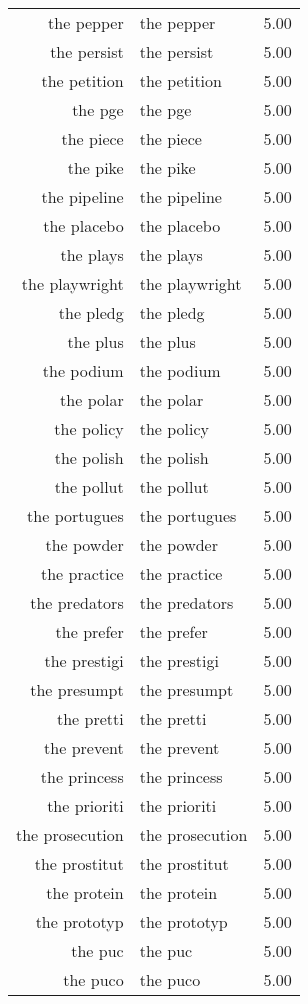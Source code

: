 \begin{table}[ht]
\begin{tabular}{rlr}
  the pepper & the pepper & 5.00 \\ 
  the persist & the persist & 5.00 \\ 
  the petition & the petition & 5.00 \\ 
  the pge & the pge & 5.00 \\ 
  the piece & the piece & 5.00 \\ 
  the pike & the pike & 5.00 \\ 
  the pipeline & the pipeline & 5.00 \\ 
  the placebo & the placebo & 5.00 \\ 
  the plays & the plays & 5.00 \\ 
  the playwright & the playwright & 5.00 \\ 
  the pledg & the pledg & 5.00 \\ 
  the plus & the plus & 5.00 \\ 
  the podium & the podium & 5.00 \\ 
  the polar & the polar & 5.00 \\ 
  the policy & the policy & 5.00 \\ 
  the polish & the polish & 5.00 \\ 
  the pollut & the pollut & 5.00 \\ 
  the portugues & the portugues & 5.00 \\ 
  the powder & the powder & 5.00 \\ 
  the practice & the practice & 5.00 \\ 
  the predators & the predators & 5.00 \\ 
  the prefer & the prefer & 5.00 \\ 
  the prestigi & the prestigi & 5.00 \\ 
  the presumpt & the presumpt & 5.00 \\ 
  the pretti & the pretti & 5.00 \\ 
  the prevent & the prevent & 5.00 \\ 
  the princess & the princess & 5.00 \\ 
  the prioriti & the prioriti & 5.00 \\ 
  the prosecution & the prosecution & 5.00 \\ 
  the prostitut & the prostitut & 5.00 \\ 
  the protein & the protein & 5.00 \\ 
  the prototyp & the prototyp & 5.00 \\ 
  the puc & the puc & 5.00 \\ 
  the puco & the puco & 5.00 \\ 

\end{tabular}
\end{table}

